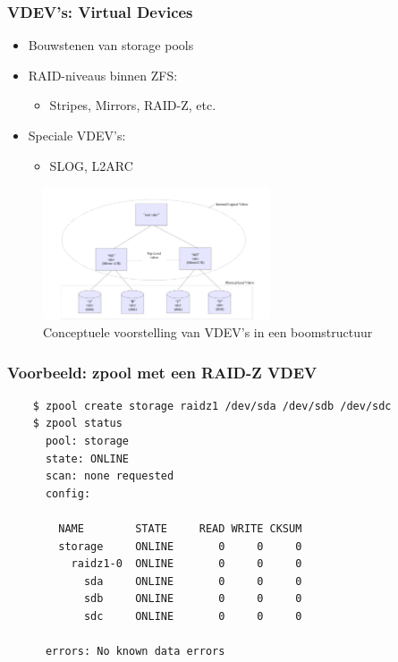 \documentclass{beamer}
\begin{document}
\begin{frame}
  \frametitle{VDEV's: Virtual Devices}
  \begin{itemize}
    \item Bouwstenen van storage pools
    \item RAID-niveaus binnen ZFS:
    \begin{itemize}
      \item Stripes, Mirrors, RAID-Z, etc. 
    \end{itemize}
    \item Speciale VDEV's:
    \begin{itemize}
      \item SLOG, L2ARC
    \end{itemize}
  \end{itemize}
  \begin{figure}
    \centering
    \includegraphics[width=0.6\textwidth]{img/h6_vdevs_tree}
    \caption{Conceptuele voorstelling van VDEV's in een boomstructuur \autocite{Microsystems2006}}
    \label{fig:vdevs_boom}
  \end{figure}
\end{frame}


\begin{frame}[fragile]
  \frametitle{Voorbeeld: zpool met een RAID-Z VDEV}
  \begin{verbatim}
    $ zpool create storage raidz1 /dev/sda /dev/sdb /dev/sdc
    $ zpool status
      pool: storage
      state: ONLINE
      scan: none requested
      config:

	    NAME        STATE     READ WRITE CKSUM
	    storage     ONLINE       0     0     0
	      raidz1-0  ONLINE       0     0     0
	        sda     ONLINE       0     0     0
	        sdb     ONLINE       0     0     0
	        sdc     ONLINE       0     0     0

      errors: No known data errors
  \end{verbatim}
\end{frame}
\end{document}
